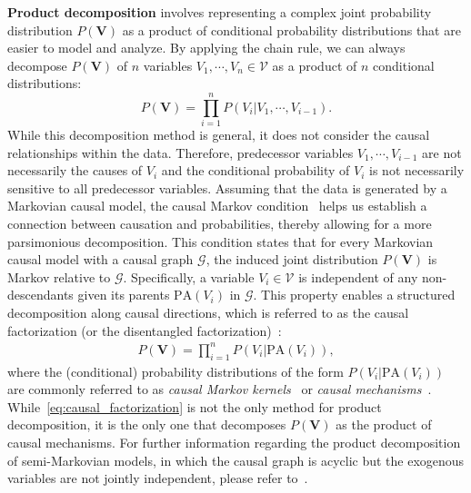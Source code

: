 \documentclass[10pt]{article} %
\theoremstyle{definition}
\begin{document}
\textbf{Product decomposition} involves representing a complex joint probability distribution $P(\mathbf{V})$ as a product of conditional probability distributions that are easier to model and analyze. 
By applying the chain rule, we can always decompose $P(\mathbf{V})$ of $n$ variables $V_1, \cdots, V_n \in \mathcal{V}$ as a product of $n$ conditional distributions:
$$P(\mathbf{V}) = \prod_{i=1}^n P(V_i | V_1, \cdots, V_{i-1}).$$
While this decomposition method is general, it does not consider the causal relationships within the data. 
Therefore, predecessor variables $V_1, \cdots, V_{i-1}$ are not necessarily the causes of $V_i$ and the conditional probability of $V_i$ is not necessarily sensitive to all predecessor variables. 
Assuming that the data is generated by a Markovian causal model, the causal Markov condition~\citep[Chapter~1]{pearlCausality2009} helps us establish a connection between causation and probabilities, thereby allowing for a more parsimonious decomposition.
This condition states that for every Markovian causal model with a causal graph $\mathcal{G}$, the induced joint distribution $P(\mathbf{V})$ is Markov relative to $\mathcal{G}$. Specifically, a variable $V_i \in \mathcal{V}$ is independent of any non-descendants given its parents $\mbox{PA}(V_i)$ in $\mathcal{G}$. This property enables a structured decomposition along causal directions, which is referred to as the causal factorization (or the disentangled factorization)~\citep{scholkopfCausalRepresentationLearning2021a}:
\begin{align}
\label{eq:causal_factorization}
P(\mathbf{V}) = \prod_{i=1}^n P(V_i | \mbox{PA}(V_i)),
\end{align}
where the (conditional) probability distributions of the form $P(V_i | \mbox{PA}(V_i))$ are commonly referred to as \emph{causal Markov kernels}~\citep{petersElementsCausalInference2017} or \emph{causal mechanisms}~\citep{scholkopfCausalRepresentationLearning2021a}. 
While~\eqref{eq:causal_factorization} is not the only method for product decomposition, it is the only one that decomposes $P(\mathbf{V})$ as the product of causal mechanisms. 
For further information regarding the product decomposition of semi-Markovian models, in which the causal graph is acyclic but the exogenous variables are not jointly independent, please refer to~\citet{bareinboimPearlHierarchyFoundations2022}.
\end{document}
